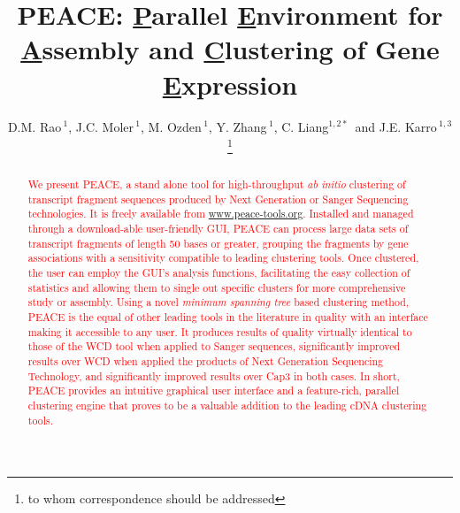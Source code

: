 \documentclass[a4,center,fleqn]{NAR}
\newcommand{\mc}[1]{\textcolor{red}{#1}}
\newcommand{\peace} {{\small PEACE}}
\newcommand{\wcd} {{\small WCD}}
\newcommand{\capthree} {{\small Cap3}}
\begin{document}
\title{PEACE: {\underline P}arallel {\underline E}nvironment for {\underline A}ssembly
  and {\underline C}lustering of Gene {\underline E}xpression}

\author{D.M. Rao\,$^{1}$, J.C. Moler\,$^{1}$, M. Ozden\,$^1$, Y. Zhang\,$^{1}$,
  C. Liang$^{1,2*}$\, and J.E. Karro\,$^{1,3}$\footnote{to whom
    correspondence should be addressed}}

\address{$^1$ Department of Computer Science and Software Engineering, \\
  $^2$ Department of Botany, \\
  $^3$ and Department of Microbiology, Miami University, Oxford, Ohio,
  USA}




\maketitle

\begin{abstract}
  \mc{We present \peace, a stand alone tool for high-throughput {\it
      ab initio} clustering of transcript fragment sequences produced
    by Next Generation or Sanger Sequencing technologies.  It is
    freely available from
    \href{http://www.peace-tools.org}{www.peace-tools.org}.  Installed
    and managed through a download-able user-friendly GUI, \peace\/
    can process large data sets of transcript fragments of length 50
    bases or greater, grouping the fragments by gene associations with
    a sensitivity compatible to leading clustering tools.  Once
    clustered, the user can employ the GUI's analysis functions,
    facilitating the easy collection of statistics and allowing them
    to single out specific clusters for more comprehensive study or
    assembly.  Using a novel {\it minimum spanning tree} based
    clustering method, \peace\/ is the equal of other leading tools in
    the literature in quality with an interface making it
    accessible to any user.  It produces results of quality virtually
    identical to those of the \wcd\/ tool when applied to Sanger
    sequences, significantly improved results over \wcd\/ when applied
    the products of Next Generation Sequencing Technology, and
    significantly improved results over \capthree\/ in both cases.  In
    short, \peace\/ provides an intuitive graphical user interface and
    a feature-rich, parallel clustering engine that proves to be a
    valuable addition to the leading cDNA clustering tools.}

\end{abstract}
\end{document}
